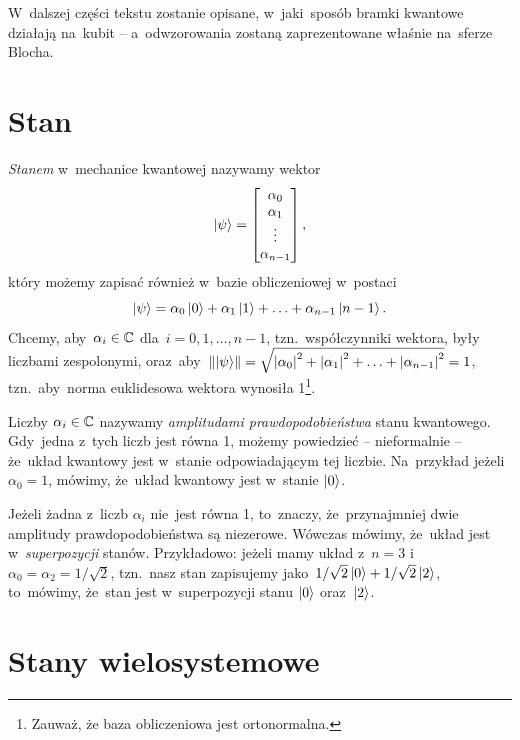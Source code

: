 W~dalszej części tekstu zostanie opisane, w~jaki~sposób bramki kwantowe działają
na~kubit -- a~odwzorowania zostaną zaprezentowane właśnie na~sferze Blocha.

\section{Stan}
\emph{Stanem} w~mechanice kwantowej nazywamy wektor
$$
	\ket{\psi}=
	\begin{bmatrix}
		\alpha_0 \\
		\alpha_1 \\
		\vdots   \\
		\alpha_{n-1}
	\end{bmatrix},
$$
który możemy zapisać również w~bazie obliczeniowej w~postaci
$$
	\ket{\psi}=\alpha_0\ket{0} + \alpha_1 \ket{1} + \ldots + \alpha_{n-1} \ket{n-1}.
$$
Chcemy, aby~$\alpha_i \in \mathbb{C}$ dla~$i=0, 1, \ldots, n-1$, tzn.~współczynniki
wektora, były liczbami zespolonymi, oraz~aby~$\norm{\ket{\psi}} = \sqrt{\abs{\alpha_0}^2
		+ \abs{\alpha_1}^2 + \ldots + \abs{\alpha_{n-1}}^2} = 1$, tzn.~aby~norma
euklidesowa wektora wynosiła
1\footnote{Zauważ, że baza obliczeniowa jest ortonormalna.}.

Liczby $\alpha_i \in \mathbb{C}$ nazywamy
\emph{amplitudami prawdopodobieństwa} stanu kwantowego. Gdy~jedna
z~tych liczb jest równa 1, możemy powiedzieć -- nieformalnie -- że~układ
kwantowy jest w~stanie odpowiadającym tej liczbie. Na~przykład jeżeli~$\alpha_0=1$,
mówimy, że~układ kwantowy jest w~stanie $\ket{0}$.

Jeżeli żadna z~liczb $\alpha_i$ nie~jest równa 1, to~znaczy, że~przynajmniej dwie
amplitudy prawdopodobieństwa są niezerowe. Wówczas mówimy, że~układ jest w~\emph{superpozycji}
stanów. Przykładowo: jeżeli mamy układ z~$n=3$ i~$\alpha_0 = \alpha_2 = 1/\sqrt{2}$, tzn.~nasz
stan zapisujemy jako~$1/\sqrt{2}\ket{0}+1/\sqrt{2}\ket{2}$, to~mówimy, że~stan
jest w~superpozycji stanu $\ket{0}$ oraz~$\ket{2}$.

\section{Stany wielosystemowe}
